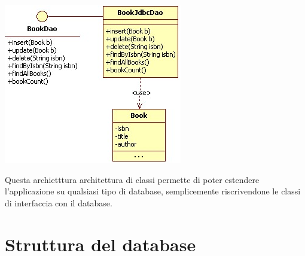 \begin{center}
\includegraphics[width=0.3\linewidth]{img/dao}
\end{center}

Questa archietttura architettura di classi permette di poter estendere l'applicazione su qualsiasi tipo di database, semplicemente riscrivendone le classi di interfaccia con il database.

\section{Struttura del database}

